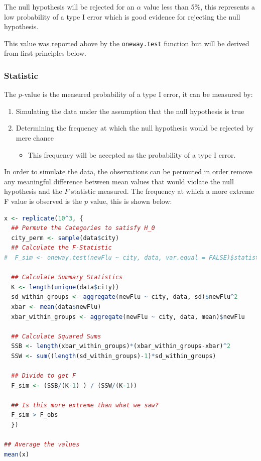 \documentclass{article}
\newcommand{\passthrough}[1]{#1}
\providecommand{\tightlist}{%
  \setlength{\itemsep}{0pt}\setlength{\parskip}{0pt}}
\begin{document}
The null hypothesis will be rejected for an \(\alpha\) value less than
5\%, this represents a low probability of a type I error which is good
evidence for rejecting the null hypothesis.

This value was reported above by the
\passthrough{\lstinline!oneway.test!} function but will be derived from
first principles below.

\hypertarget{statistic}{%
\subsubsection{Statistic}\label{statistic}}

The \(p\)-value is the measured probability of a type I error, it can be
measured by:

\begin{enumerate}
\def\labelenumi{\arabic{enumi}.}
\tightlist
\item
  Simulating the data under the assumption that the null hypothesis is
  true
\item
  Determining the frequency at which the null hypothesis would be
  rejected by mere chance

  \begin{itemize}
  \tightlist
  \item
    This frequency will be accepted as the probability of a type I
    error.
  \end{itemize}
\end{enumerate}

In order to simulate the data, the observations can be permuted in order
remove any meaningful difference between mean values that would violate
the null hypothesis and the \(F\) statistic measured. The frequency at
which a more extreme F value is observed is the \(p\) value, this is
shown below:

\begin{lstlisting}[language=R]
x <- replicate(10^3, {
  ## Permute the Categories to satisfy H_0
  city_perm <- sample(data$city)
  ## Calculate the F-Statistic
#  F_sim <- oneway.test(newFlu ~ city, data, var.equal = FALSE)$statistic

  ## Calculate Summary Statistics
  K <- length(unique(data$city))
  sd_within_groups <- aggregate(newFlu ~ city, data, sd)$newFlu^2
  xbar <- mean(data$newFlu)
  xbar_within_groups <- aggregate(newFlu ~ city, data, mean)$newFlu

  ## Calculate Squared Sums
  SSB <- length(xbar_within_groups)*(xbar_within_groups-xbar)^2
  SSW <- sum((length(sd_within_groups)-1)*sd_within_groups)

  ## Divide to get F
  F_sim <- (SSB/(K-1) ) / (SSW/(K-1))

  ## Is this more extreme than what we saw?
  F_sim > F_obs
  })

## Average the values
mean(x)
\end{lstlisting}
\end{document}

